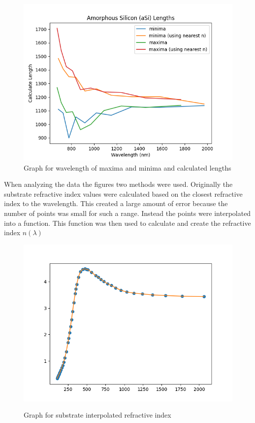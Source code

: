 \documentclass[10pt,a4paper]{article}
\begin{document}
\begin{multicols}{2}
\begin{figure}[H]
\includegraphics[scale=0.5]{asilengtherror}
\caption{Graph for wavelength of maxima and minima and calculated lengths}
\end{figure}
When analyzing the data the figures two methods were used. Originally the substrate refractive index values were calculated based on the closest refractive index to the wavelength. This created a large amount of error because the number of points was small for such a range. Instead the points were interpolated into a function. This function was then used to calculate and create the refractive index $n(\lambda)$ 

\begin{figure}[H]\centering\label{ASirefractiveindex}
\includegraphics[scale=0.5]{ninterp}\caption{Graph for substrate interpolated refractive index}\end{figure}


\end{multicols}
\end{document}
